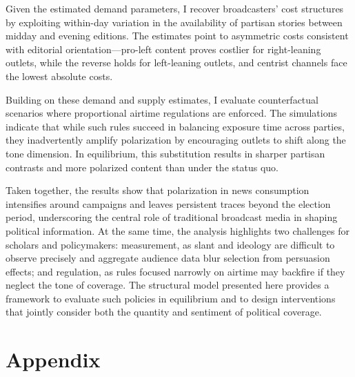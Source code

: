 \documentclass[12pt]{article}
\begin{document}
	
	Given the estimated demand parameters,  I recover broadcasters’ cost structures by exploiting within-day variation in the availability of partisan stories between midday and evening editions. The estimates point to asymmetric costs consistent with editorial orientation—pro-left content proves costlier for right-leaning outlets, while the reverse holds for left-leaning outlets, and centrist channels face the lowest absolute costs.
	
Building on these demand and supply estimates, I evaluate counterfactual scenarios where proportional airtime regulations are enforced. The simulations indicate that while such rules succeed in balancing exposure time across parties, they inadvertently amplify polarization by encouraging outlets to shift along the tone dimension. In equilibrium, this substitution results in sharper partisan contrasts and more polarized content than under the status quo.

Taken together, the results show that polarization in news consumption intensifies around campaigns and leaves persistent traces beyond the election period, underscoring the central role of traditional broadcast media in shaping political information. At the same time, the analysis highlights two challenges for scholars and policymakers: measurement, as slant and ideology are difficult to observe precisely and aggregate audience data blur selection from persuasion effects; and regulation, as rules focused narrowly on airtime may backfire if they neglect the tone of coverage. The structural model presented here provides a framework to evaluate such policies in equilibrium and to design interventions that jointly consider both the quantity and sentiment of political coverage.
	

	
	
	\clearpage
	
	\pagestyle{plain}  
	
	
	
	
	
	
	\clearpage

\appendix

\part{Appendix} %
\end{document}
